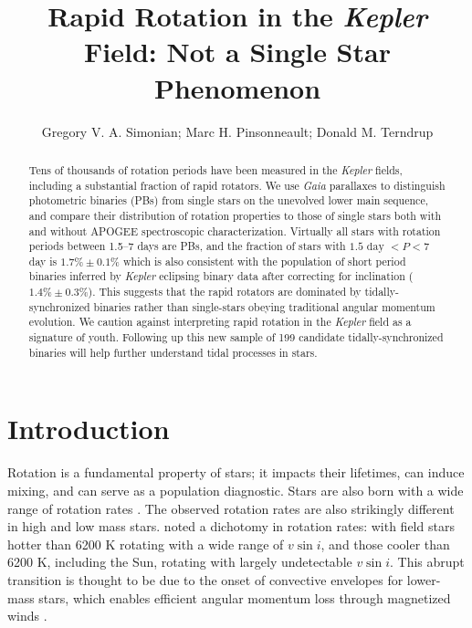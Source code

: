 \documentclass[manuscript]{aastex6}
\newcommand{\vsini}{\ensuremath{v \sin i}}
\newcommand{\Kepler}{\mbox{\textit{Kepler}}}
\newcommand{\Gaia}{\mbox{\textit{Gaia}}}
\begin{document}
\title{Rapid Rotation in the \Kepler{} Field: Not a Single Star
Phenomenon}
\author{Gregory V. A. Simonian; Marc H. Pinsonneault; Donald M. Terndrup}

\begin{abstract}
    Tens of thousands of rotation periods have been measured in the
    \Kepler{} fields, including a substantial fraction of rapid rotators. We 
    use \Gaia{} parallaxes to distinguish photometric binaries (PBs) from
    single stars on the unevolved lower main sequence, and compare their
    distribution of rotation properties to those of single stars both with and 
    without APOGEE spectroscopic characterization. Virtually all stars 
    with rotation periods between 1.5--7 days are PBs, and the fraction of stars
    with \(1.5 \textrm{ day } < P < 7\) day is \(1.7\% \pm 0.1\%\) which
    is also consistent with the population of short period binaries inferred 
    by \Kepler{} eclipsing binary data after correcting for inclination
    (\(1.4\% \pm 0.3\%\)). This suggests that the rapid rotators 
    are dominated by tidally-synchronized binaries rather than single-stars 
    obeying traditional angular momentum evolution. We caution 
    against interpreting rapid rotation in the \Kepler{} field 
    as a signature of youth. Following up this new sample of 199 candidate 
    tidally-synchronized binaries will help further understand 
    tidal processes in stars.
\end{abstract}

\section{Introduction}

Rotation is a fundamental property of stars; it impacts their lifetimes, can
induce mixing, and can serve as a population diagnostic. Stars are also born 
with a wide range of rotation rates \citep{Attridge92, Herbst00, Henderson12}.
The observed rotation rates are also strikingly different in high and low mass 
stars. \citet{Kraft67} noted a dichotomy in rotation rates: with field stars 
hotter than 6200 K rotating with a wide range of \vsini, and those cooler than 
6200 K, including the Sun, rotating with largely undetectable \vsini. This abrupt transition is thought to
be due to the onset of convective envelopes for lower-mass stars, which 
enables efficient angular momentum loss through magnetized winds 
\citep{Parker58,Weber67}.
\end{document}
